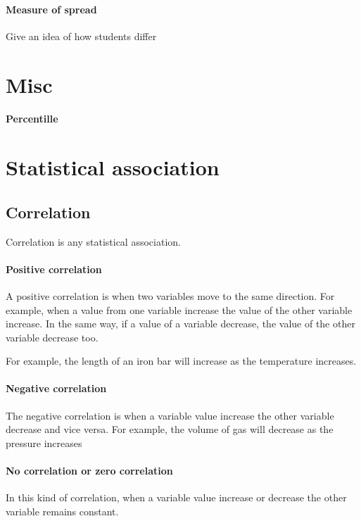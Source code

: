 \documentclass[]{article}
\begin{document}
\paragraph{Measure of spread} Give an idea of how students differ























\section{Misc}

\paragraph{Percentille}

\section{Statistical association}

\subsection{Correlation}

Correlation is any statistical association.

\paragraph{Positive correlation}
A positive correlation is when two variables move to the same direction. For example, when a value from 
one variable increase the value of the other variable increase. In the same way, if a value of a variable
decrease, the value of the other variable decrease too.

For example, the length of an iron bar will increase as the temperature increases.

\paragraph{Negative correlation}
The negative correlation is when a variable value increase the other variable decrease and vice versa. 
For example, the volume of gas will decrease as the pressure increases

\paragraph{No correlation or zero correlation}
In this kind of correlation, when a variable value increase or decrease the other variable remains constant.
\end{document}
